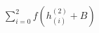 \documentclass[]{standalone}
\begin{document}
$\sum_{i=0}^{2}f\left( h_{(i)}^{(2)} + B \right)$
\end{document}
